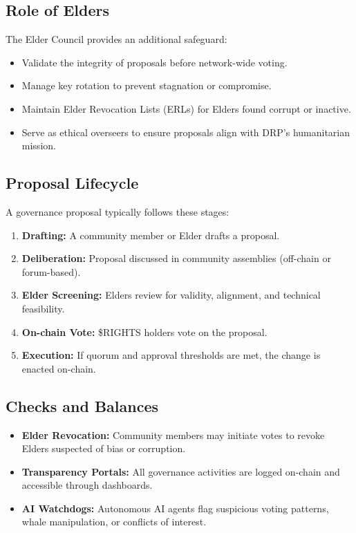 \documentclass[11pt,a4paper]{article}
\begin{document}
\subsection{Role of Elders}
The Elder Council provides an additional safeguard:
\begin{itemize}
    \item Validate the integrity of proposals before network-wide voting.
    \item Manage key rotation to prevent stagnation or compromise.
    \item Maintain Elder Revocation Lists (ERLs) for Elders found corrupt or inactive.
    \item Serve as ethical overseers to ensure proposals align with DRP’s humanitarian mission.
\end{itemize}

\subsection{Proposal Lifecycle}
A governance proposal typically follows these stages:
\begin{enumerate}
    \item \textbf{Drafting:} A community member or Elder drafts a proposal.
    \item \textbf{Deliberation:} Proposal discussed in community assemblies (off-chain or forum-based).
    \item \textbf{Elder Screening:} Elders review for validity, alignment, and technical feasibility.
    \item \textbf{On-chain Vote:} \$RIGHTS holders vote on the proposal.
    \item \textbf{Execution:} If quorum and approval thresholds are met, the change is enacted on-chain.
\end{enumerate}

\subsection{Checks and Balances}
\begin{itemize}
    \item \textbf{Elder Revocation:} Community members may initiate votes to revoke Elders suspected of bias or corruption.
    \item \textbf{Transparency Portals:} All governance activities are logged on-chain and accessible through dashboards.
    \item \textbf{AI Watchdogs:} Autonomous AI agents flag suspicious voting patterns, whale manipulation, or conflicts of interest.
\end{itemize}
\end{document}
